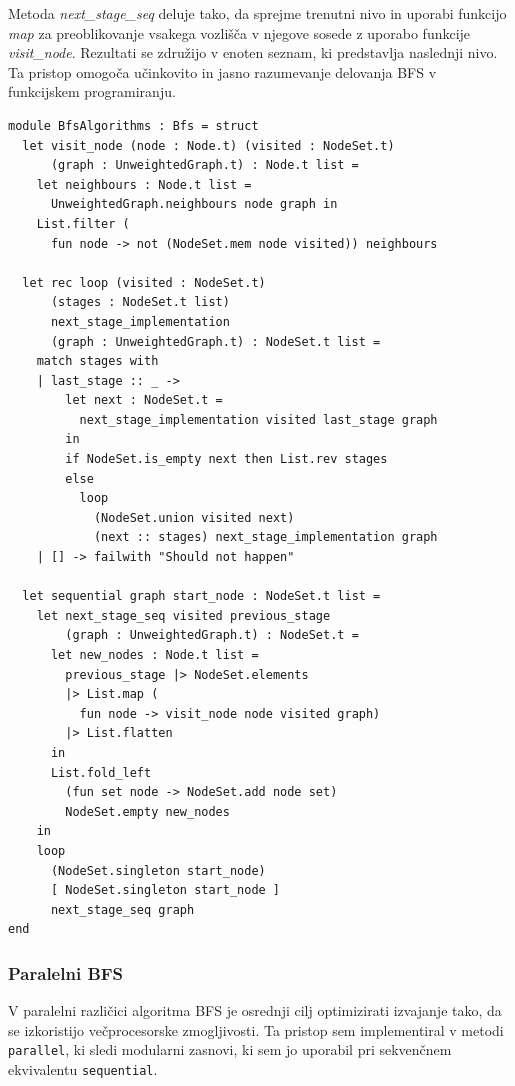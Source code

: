 \documentclass[mat1, tisk]{fmfdelo}
\begin{document}
Metoda \textit{next\_stage\_seq} deluje tako, da sprejme trenutni nivo in uporabi funkcijo \textit{map} za
preoblikovanje vsakega vozlišča v njegove sosede z uporabo funkcije \textit{visit\_node}. 
Rezultati se združijo v enoten seznam, ki predstavlja naslednji nivo.
Ta pristop omogoča učinkovito in jasno razumevanje delovanja BFS v funkcijskem programiranju.

\begin{lstlisting}[label=lst:bfs_sequential]
module BfsAlgorithms : Bfs = struct
  let visit_node (node : Node.t) (visited : NodeSet.t)
      (graph : UnweightedGraph.t) : Node.t list =
    let neighbours : Node.t list = 
      UnweightedGraph.neighbours node graph in
    List.filter (
      fun node -> not (NodeSet.mem node visited)) neighbours

  let rec loop (visited : NodeSet.t) 
      (stages : NodeSet.t list)
      next_stage_implementation
      (graph : UnweightedGraph.t) : NodeSet.t list =
    match stages with
    | last_stage :: _ ->
        let next : NodeSet.t =
          next_stage_implementation visited last_stage graph
        in
        if NodeSet.is_empty next then List.rev stages
        else
          loop
            (NodeSet.union visited next)
            (next :: stages) next_stage_implementation graph
    | [] -> failwith "Should not happen"

  let sequential graph start_node : NodeSet.t list =
    let next_stage_seq visited previous_stage
        (graph : UnweightedGraph.t) : NodeSet.t =
      let new_nodes : Node.t list =
        previous_stage |> NodeSet.elements
        |> List.map (
          fun node -> visit_node node visited graph)
        |> List.flatten
      in
      List.fold_left
        (fun set node -> NodeSet.add node set)
        NodeSet.empty new_nodes
    in
    loop
      (NodeSet.singleton start_node)
      [ NodeSet.singleton start_node ]
      next_stage_seq graph
end

\end{lstlisting}

\subsubsection{Paralelni BFS}

V paralelni različici algoritma BFS je osrednji cilj optimizirati izvajanje tako, da se izkoristijo večprocesorske zmogljivosti.
Ta pristop sem implementiral v metodi \texttt{parallel}, ki sledi modularni zasnovi, ki sem jo uporabil pri sekvenčnem
ekvivalentu \texttt{sequential}.
\end{document}
